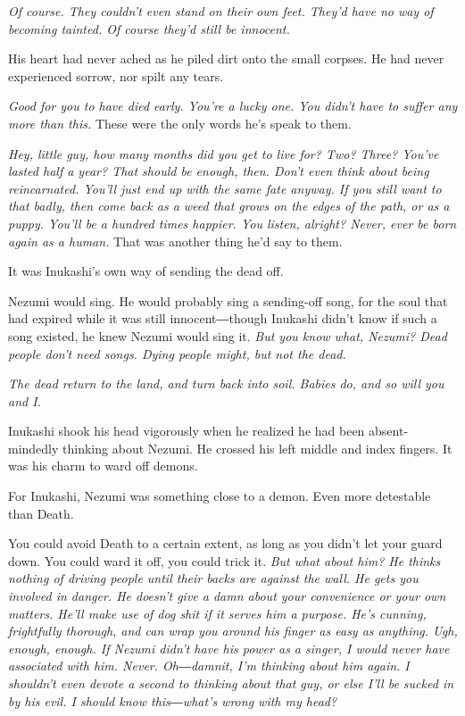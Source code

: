 \emph{Of course. They couldn't even stand on their own feet. They'd have no
way of becoming tainted. Of course they'd still be innocent.}

His heart had never ached as he piled dirt onto the small corpses. He
had never experienced sorrow, nor spilt any tears.

\emph{Good for you to have died early. You're a lucky one. You didn't have to
suffer any more than this.} These were the only words he's speak to them.

\emph{Hey, little guy, how many months did you get to live for? Two? Three?
You've lasted half a year? That should be enough, then. Don't even think
about being reincarnated. You'll just end up with the same fate anyway.
If you still want to that badly, then come back as a weed that grows on
the edges of the path, or as a puppy. You'll be a hundred times happier.
You listen, alright? Never, ever be born again as a human.} That was
another thing he'd say to them.

It was Inukashi's own way of sending the dead off.

Nezumi would sing. He would probably sing a sending-off song, for the
soul that had expired while it was still innocent―though Inukashi didn't
know if such a song existed, he knew Nezumi would sing it. \emph{But you know
what, Nezumi? Dead people don't need songs. Dying people might, but not
the dead.}

\emph{The dead return to the land, and turn back into soil. Babies do, and so
will you and I.}

Inukashi shook his head vigorously when he realized he had been
absent-mindedly thinking about Nezumi. He crossed his left middle and
index fingers. It was his charm to ward off demons.

For Inukashi, Nezumi was something close to a demon. Even more
detestable than Death.

You could avoid Death to a certain extent, as long as you didn't let
your guard down. You could ward it off, you could trick it. \emph{But what
about him? He thinks nothing of driving people until their backs are
against the wall. He gets you involved in danger. He doesn't give a damn
about your convenience or your own matters. He'll make use of dog shit
if it serves him a purpose. He's cunning, frightfully thorough, and can
wrap you around his finger as easy as anything. Ugh, enough, enough. If
Nezumi didn't have his power as a singer, I would never have associated
with him. Never. Oh―damnit, I'm thinking about him again. I shouldn't
even devote a second to thinking about that guy, or else I'll be sucked
in by his evil. I should know this―what's wrong with my head?}

